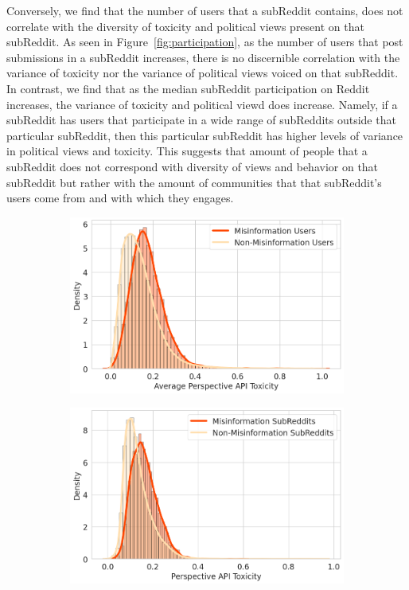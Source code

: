 Conversely, we find that the number of users that a subReddit contains, does not correlate with the diversity of toxicity and political views present on that subReddit. As seen in Figure~\ref{fig:participation}, as the number of users that post submissions in a subReddit increases, there is no discernible correlation with the variance of toxicity nor the variance of political views voiced on that subReddit. In contrast, we find that as the median subReddit participation on Reddit increases, the variance of toxicity and political viewd does increase.  Namely, if a subReddit has users that participate in a wide range of subReddits outside that particular subReddit, then this particular subReddit has higher levels of variance in political views and toxicity. This suggests that amount of people that a subReddit does not correspond with diversity of views and behavior on that subReddit but rather with the amount of communities that that subReddit's users come from and with which they engages. 
\begin{figure}
\begin{subfigure}{.48\textwidth}
  \centering
  \includegraphics[width=1\linewidth]{figures/user-misinfo-toxicity.png}
\label{fig:user-misnformation}
\end{subfigure}%
\begin{subfigure}{.48\textwidth}
  \centering
  \includegraphics[width=1\linewidth]{figures/reddit-misinfo-toxicity.png}
 \label{fig:reddit-misinformation}
\end{subfigure}
\label{fig:misinformation-reddit-user}
\end{figure}
